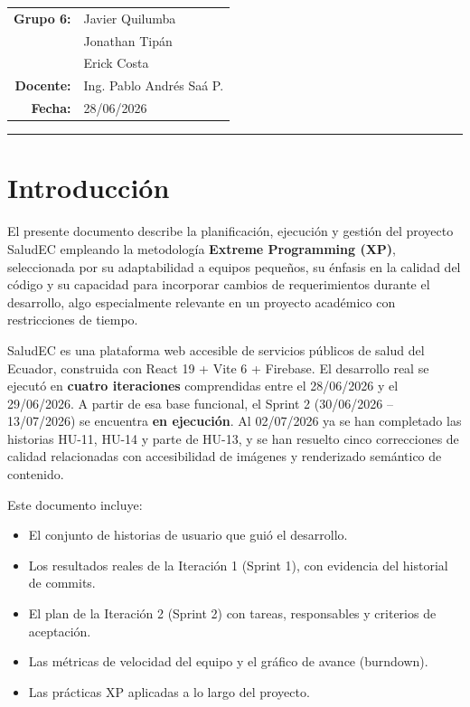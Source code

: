 \documentclass[12pt, a4paper]{article}
\begin{document}
\begin{titlepage}
\vspace{0.8cm}
\begin{tabular}{@{}rl@{}}
  \textbf{\color{navydeep}Grupo 6:} & Javier Quilumba \\
  & Jonathan Tipán \\
  & Erick Costa \\[8pt]
  \textbf{\color{navydeep}Docente:} & Ing. Pablo Andrés Saá P. \\[4pt]
  \textbf{\color{navydeep}Fecha:}   & 28/06/2026 \\
\end{tabular}

\vspace{1.0cm}
{\color{violetxp}\rule{0.85\linewidth}{1.5pt}}
\end{titlepage}

\newpage
{}
\tableofcontents

\newpage
{}

\section{Introducción}

El presente documento describe la planificación, ejecución y gestión del proyecto SaludEC empleando la metodología \textbf{Extreme Programming (XP)}, seleccionada por su adaptabilidad a equipos pequeños, su énfasis en la calidad del código y su capacidad para incorporar cambios de requerimientos durante el desarrollo, algo especialmente relevante en un proyecto académico con restricciones de tiempo.

SaludEC es una plataforma web accesible de servicios públicos de salud del Ecuador, construida con React 19 + Vite 6 + Firebase. El desarrollo real se ejecutó en \textbf{cuatro iteraciones} comprendidas entre el 28/06/2026 y el 29/06/2026. A partir de esa base funcional, el Sprint 2 (30/06/2026 -- 13/07/2026) se encuentra \textbf{en ejecución}. Al 02/07/2026 ya se han completado las historias HU-11, HU-14 y parte de HU-13, y se han resuelto cinco correcciones de calidad relacionadas con accesibilidad de imágenes y renderizado semántico de contenido.

Este documento incluye:
\begin{itemize}
  \item El conjunto de historias de usuario que guió el desarrollo.
  \item Los resultados reales de la Iteración 1 (Sprint 1), con evidencia del historial de commits.
  \item El plan de la Iteración 2 (Sprint 2) con tareas, responsables y criterios de aceptación.
  \item Las métricas de velocidad del equipo y el gráfico de avance (burndown).
  \item Las prácticas XP aplicadas a lo largo del proyecto.
\end{itemize}
\end{document}
